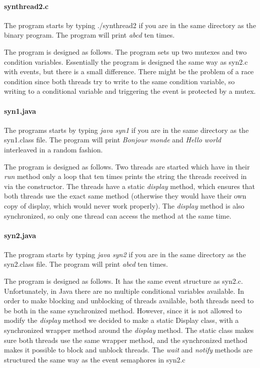 \documentclass[a4paper,10pt]{article}
\begin{document}
\paragraph{synthread2.c} The program starts by typing ./synthread2 if you are in the same directory as the binary program. The program will print \emph{abcd} ten times.

The program is designed as follows. The program sets up two mutexes and two condition variables. Essentially the program is designed the same way as syn2.c with events, but there is a small difference. There might be the problem of a race condition since both threads try to write to the same condition variable, so writing to a conditional variable and triggering the event is protected by a mutex. 

\paragraph{syn1.java} The programs starts by typing \emph{java syn1} if you are in the same directory as the syn1.class file. The program will print \emph{Bonjour monde} and \emph{Hello world} interleaved in a random fashion.

The program is designed as follows. Two threads are started which have in their \emph{run} method only a loop that ten times prints the string the threads received in via the constructor. The threads have a static \emph{display} method, which ensures that both threads use the exact same method (otherwise they would have their own copy of display, which would never work properly). The \emph{display} method is also synchronized, so only one thread can access the method at the same time.

\paragraph{syn2.java} The program starts by typing \emph{java syn2} if you are in the same directory as the syn2.class file. The program will print \emph{abcd} ten times.

The program is designed as follows. It has the same event structure as syn2.c. Unfortunately, in Java there are no multiple conditional variables available. In order to make blocking and unblocking of threads available, both threads need to be both in the same synchronized method. However, since it is not allowed to modify the \emph{display} method we decided to make a static Display class, with a synchronized wrapper method around the \emph{display} method. The static class makes sure both threads use the same wrapper method, and the synchronized method makes it possible to block and unblock threads. The \emph{wait} and \emph{notify} methods are structured the same way as the event semaphores in syn2.c
\end{document}
